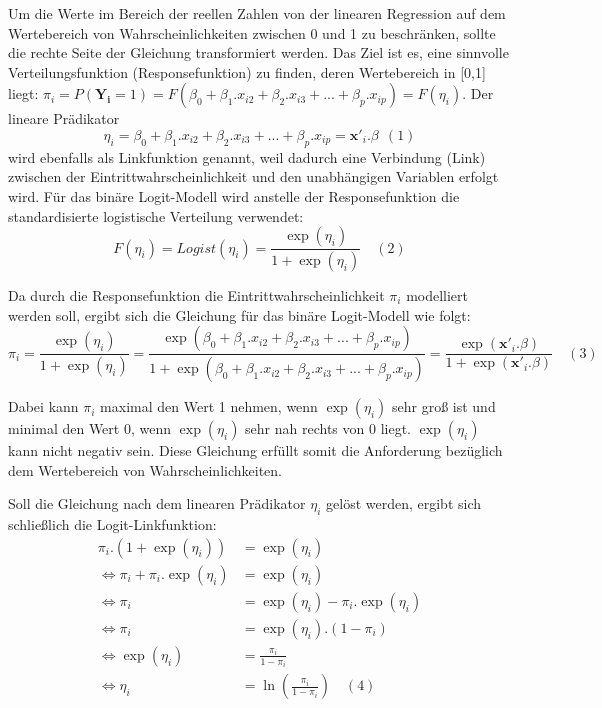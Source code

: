 \documentclass[12pt,]{article}
\begin{document}
Um die Werte im Bereich der reellen Zahlen von der linearen Regression
auf dem Wertebereich von Wahrscheinlichkeiten zwischen 0 und 1 zu
beschränken, sollte die rechte Seite der Gleichung transformiert werden.
Das Ziel ist es, eine sinnvolle Verteilungsfunktion (Responsefunktion)
zu finden, deren Wertebereich in {[}0,1{]} liegt:
\(\pi_i = P(\mathbf{Y_i} = 1) = F(\beta_0 + \beta_1.x_{i2} + \beta_2.x_{i3} + ... + \beta_p.x_{ip}) = F(\eta_i)\).
Der lineare Prädikator
\[\eta_i = \beta_0 + \beta_1.x_{i2} + \beta_2.x_{i3} + ... + \beta_p.x_{ip} = \mathbf{x'}_i.\beta \ \ (1)\]
wird ebenfalls als Linkfunktion genannt, weil dadurch eine Verbindung
(Link) zwischen der Eintrittwahrscheinlichkeit und den unabhängigen
Variablen erfolgt wird. Für das binäre Logit-Modell wird anstelle der
Responsefunktion die standardisierte logistische Verteilung verwendet:
\[
F(\eta_i) = Logist(\eta_i) = \frac{\exp(\eta_i)}{1 + \exp(\eta_i)} \quad (2)
\]

Da durch die Responsefunktion die Eintrittwahrscheinlichkeit \(\pi_i\)
modelliert werden soll, ergibt sich die Gleichung für das binäre
Logit-Modell wie folgt: \[
\pi_i = \frac{\exp(\eta_i)}{1 + \exp(\eta_i)} = \frac{\exp(\beta_0 + \beta_1.x_{i2} + \beta_2.x_{i3} + ... + \beta_p.x_{ip})}{1 + \exp(\beta_0 + \beta_1.x_{i2} + \beta_2.x_{i3} + ... + \beta_p.x_{ip})} = \frac{\exp(\mathbf{x'}_i.\beta)}{1+\exp(\mathbf{x'}_i.\beta)} \quad (3)
\]

Dabei kann \(\pi_i\) maximal den Wert 1 nehmen, wenn \(\exp(\eta_i)\)
sehr groß ist und minimal den Wert 0, wenn \(\exp(\eta_i)\) sehr nah
rechts von 0 liegt. \(\exp(\eta_i)\) kann nicht negativ sein. Diese
Gleichung erfüllt somit die Anforderung bezüglich dem Wertebereich von
Wahrscheinlichkeiten.

Soll die Gleichung nach dem linearen Prädikator \(\eta_i\) gelöst
werden, ergibt sich schließlich die Logit-Linkfunktion: \[
\begin{aligned}
\pi_i.(1 + \exp(\eta_i)) &= \exp(\eta_i) \\
\Leftrightarrow \pi_i + \pi_i.\exp(\eta_i) &= \exp(\eta_i) \\
\Leftrightarrow \pi_i &= \exp(\eta_i) - \pi_i.\exp(\eta_i)  \\
\Leftrightarrow \pi_i &= \exp(\eta_i).(1-\pi_i) \\
\Leftrightarrow \exp(\eta_i) &= \frac{\pi_i}{1-\pi_i} \\
\Leftrightarrow \eta_i &= \ln(\frac{\pi_i}{1-\pi_i}) \quad (4)\\
\end{aligned} 
\]
\end{document}
